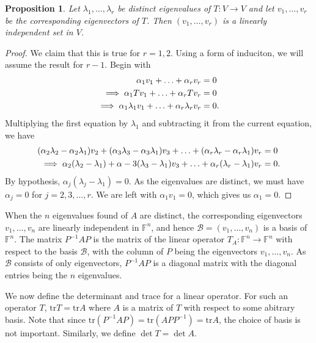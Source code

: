 \documentclass[15pt,a4paper]{book}
\newtheorem{proposition}[theorem]{Proposition}
\theoremstyle{definition}
\newcommand{\mc}[1]{\mathcal{#1}}
\newcommand{\tr}{\text{tr}}
\newcommand{\F}{\mathbb{F}}
\begin{document}
\begin{proposition}
    Let $\lambda_{1},\ldots,\lambda_{r}$ be distinct eigenvalues of $T:V \to V$ and let $v_{1},\ldots,v_{r}$ be the corresponding eigenvectors of $T$. Then $(v_{1},\ldots,v_{r})$ is a linearly independent set in $V$.
\end{proposition}
\begin{proof}
    We claim that this is true for $r = 1,2$. Using a form of induciton, we will assume the result for $r-1$. Begin with
    \begin{align}
        \alpha_{1}v_{1} + \ldots + \alpha_{r}v_{r} &= 0 \notag \\
        \implies \alpha_{1}Tv_{1} + \ldots + \alpha_{r}Tv_{r} &= 0 \notag \\
        \implies \alpha_{1}\lambda_{1}v_{1} + \ldots + \alpha_{r}\lambda_{r}v_{r} &= 0.
    \end{align}
    Multiplying the first equation by $\lambda_{1}$ and subtracting it from the current equation, we have
    \begin{align}
        (\alpha_{2}\lambda_{2}-\alpha_{2}\lambda_{1})v_{2} + (\alpha_{3}\lambda_{3}-\alpha_{3}\lambda_{1})v_{3} + \ldots + (\alpha_{r}\lambda_{r}-\alpha_{r}\lambda_{1})v_{r} &= 0 \notag \\
        \implies \alpha_{2}(\lambda_{2}-\lambda_{1}) + \alpha-{3}(\lambda_{3}-\lambda_{1})v_{3} + \ldots + \alpha_{r}(\lambda_{r}-\lambda_{1})v_{r} &= 0.
    \end{align}
    By hypothesis, $\alpha_{j}(\lambda_{j}-\lambda_{1}) = 0$. As the eigenvalues are distinct, we must have $\alpha_{j} = 0$ for $j = 2,3,\ldots,r$. We are left with $\alpha_{1}v_{1} = 0$, which gives us $\alpha_{1} = 0$.
\end{proof}
When the $n$ eigenvalues found of $A$ are distinct, the corresponding eigenvectors $v_{1},\ldots,v_{n}$ are linearly independent in $\F^{n}$, and hence $\mc{B} = (v_{1},\ldots,v_{n})$ is a basis of $\F^{n}$. The matrix $P^{-1}AP$ is the matrix of the linear operator $T_{A} : \F^{n} \to \F^{n}$ with respect to the basis $\mc{B}$, with the column of $P$ being the eigenvectors $v_{1},\ldots,v_{n}$. As $\mc{B}$ consists of only eigenvectors, $P^{-1}AP$ is a diagonal matrix with the diagonal entries being the $n$ eigenvalues.

We now define the determinant and trace for a linear operator. For such an operator $T$, $\text{tr}T = \text{tr}A$ where $A$ is a matrix of $T$ with respect to some abitrary basis. Note that since $\tr(P^{-1}AP) = \tr(APP^{-1}) = \tr{A}$, the choice of basis is not important. Similarly, we define $\det{T} = \det{A}$.
\end{document}
